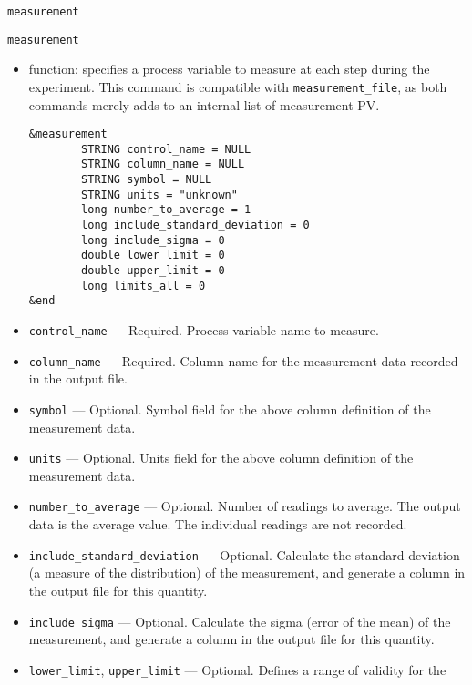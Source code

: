 \begin{itemize}
\begin{itemize}
\begin{latexonly}
\newpage\begin{center}{\Large \verb+measurement+}\end{center}
\end{latexonly}
\begin{htmlonly}
\item {\Large \verb+measurement+}
\end{htmlonly}
\begin{itemize}
        \item function: specifies a process variable to measure at each step during the experiment.
                This command is compatible with {\verb+measurement_file+}, as both commands
                merely adds to an internal list of measurement PV.
\begin{verbatim}
&measurement
        STRING control_name = NULL
        STRING column_name = NULL
        STRING symbol = NULL
        STRING units = "unknown"
        long number_to_average = 1
        long include_standard_deviation = 0
        long include_sigma = 0
        double lower_limit = 0
        double upper_limit = 0
        long limits_all = 0
&end
\end{verbatim}
        \item {\verb+control_name+} --- Required. Process variable name to measure.
        \item {\verb+column_name+} --- Required. Column name for the measurement data recorded in the output file.
        \item {\verb+symbol+} --- Optional. Symbol field for the above column definition of the measurement data.
        \item {\verb+units+} --- Optional. Units field for the above column definition of the measurement data.
        \item {\verb+number_to_average+} --- Optional. Number of readings to average. The output data
                is the average value. The individual readings are not recorded.
        \item {\verb+include_standard_deviation+} ---  Optional. Calculate the standard deviation 
                (a measure of the distribution) of the
                measurement, and generate a column in the output file for this quantity.
        \item {\verb+include_sigma+} ---  Optional. Calculate the sigma (error of the mean) of the
                measurement, and generate a column in the output file for this quantity.
        \item {\verb+lower_limit+}, {\verb+upper_limit+} --- Optional. Defines a range of validity for the

\end{itemize}
\end{itemize}
\end{itemize}

